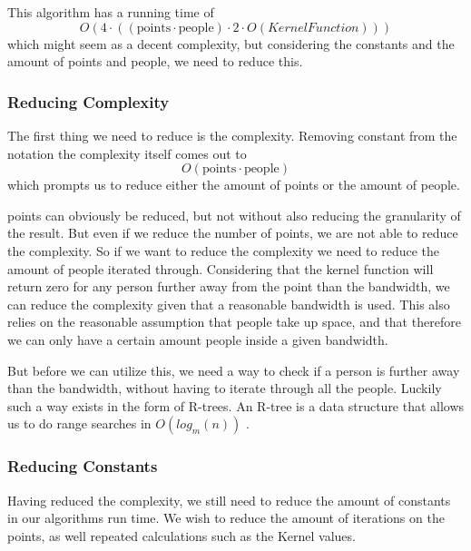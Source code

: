 This algorithm has a running time of $$O(4\cdot((\text{points} \cdot \text{people}) \cdot 2 \cdot O(KernelFunction)))$$ which might seem as a decent complexity, but considering the constants and the amount of points and people, we need to reduce this.


\subsubsection{Reducing Complexity}

The first thing we need to reduce is the complexity. Removing constant from the notation the complexity itself comes out to $$O(\text{points} \cdot \text{people})$$ which prompts us to reduce either the amount of points or the amount of people.

points can obviously be reduced, but not without also reducing the granularity of the result. But even if we reduce the number of points, we are not able to reduce the complexity. So if we want to reduce the complexity we need to reduce the amount of people iterated through. Considering that the kernel function will return zero for any person further away from the point than the bandwidth, we can reduce the complexity given that a reasonable bandwidth is used. This also relies on the reasonable assumption that people take up space, and that therefore we can only have a certain amount people inside a given bandwidth.

But before we can utilize this, we need a way to check if a person is further away than the bandwidth, without having to iterate through all the people. Luckily such a way exists in the form of R-trees. An R-tree is a data structure that allows us to do range searches in $O(log_m(n))$ \cite{} .


\subsubsection{Reducing Constants}

Having reduced the complexity, we still need to reduce the amount of constants in our algorithms run time. We wish to reduce the amount of iterations on the points, as well repeated calculations such as the Kernel values.



